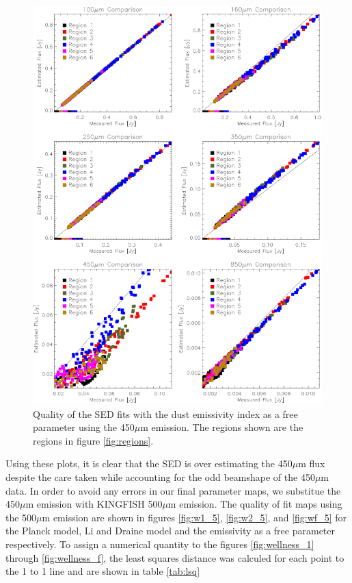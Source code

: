 \begin{figure}
  \centering
  \includegraphics[width=1.\textwidth]{sed_imgs/flux_compare_free_4.eps}
  \caption[Emissivity as a Free Parameter SED Fit Quality Using 450$\mu$m Data]{Quality of the SED fits with the dust emissivity index as a free parameter using the 450$\mu$m emission.  The regions shown are the regions in figure \ref{fig:regions}.}
  \label{fig:wf_4}
\end{figure}

Using these plots, it is clear that the SED is over estimating the 450$\mu$m flux despite the care taken while accounting for the odd beamshape of the 450$\mu$m data.  In order to avoid any errors in our final parameter maps, we substitue the 450$\mu$m emission with KINGFISH 500$\mu$m emission.  The quality of fit maps using the 500$\mu$m emission are shown in figures \ref{fig:w1_5}, \ref{fig:w2_5}, and \ref{fig:wf_5} for the Planck model, Li and Draine model and the emissivity as a free parameter respectively.  To assign a numerical quantity to the figures \ref{fig:wellness_1} through \ref{fig:wellness_f}, the least squares distance was calculed for each point to the 1 to 1 line and are shown in table \ref{tab:lsq}

